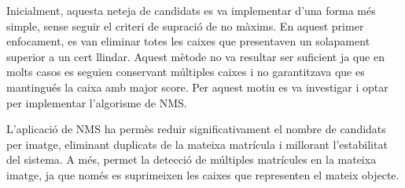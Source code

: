 Inicialment, aquesta neteja de candidats es va implementar d'una forma més simple, sense seguir el criteri de supració de no màxims. En aquest primer enfocament, es van eliminar totes les caixes que presentaven un solapament superior a un cert llindar. Aquest mètode no va resultar ser suficient ja que en molts casos es seguien conservant múltiples caixes i no garantitzava que es mantingués la caixa amb major score. Per aquest motiu es va investigar i optar per implementar l'algorisme de NMS.

L'aplicació de NMS ha permès reduir significativament el nombre de candidats per imatge, eliminant duplicats de la mateixa matrícula i millorant l'estabilitat del sistema. A més, permet la detecció de múltiples matrícules en la mateixa imatge, ja que només es suprimeixen les caixes que representen el mateix objecte. 


